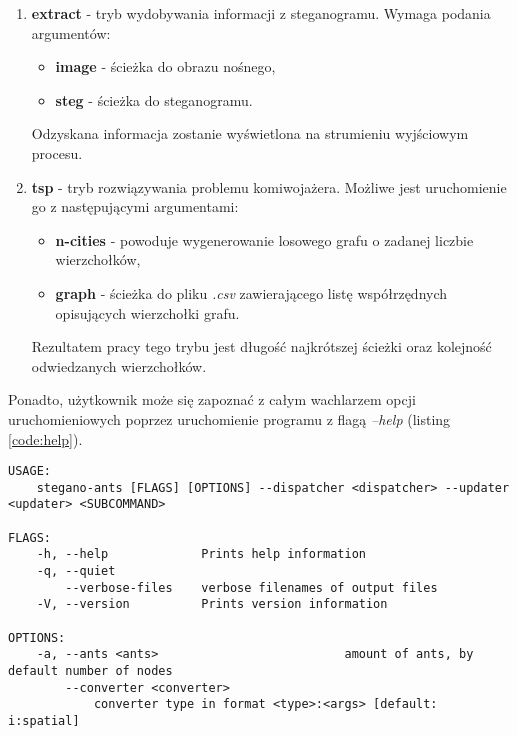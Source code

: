{{{\begin{enumerate}
                \item \textbf{extract} - tryb wydobywania informacji z steganogramu. Wymaga podania argumentów:
                    \begin{itemize}
                        \item \textbf{image} - ścieżka do obrazu nośnego,
                        \item \textbf{steg} - ścieżka do steganogramu.
                    \end{itemize}

                    Odzyskana informacja zostanie wyświetlona na strumieniu wyjściowym procesu.

                \item \textbf{tsp} - tryb rozwiązywania problemu komiwojażera. Możliwe jest uruchomienie go z
                następującymi argumentami:
                    \begin{itemize}
                        \item \textbf{n-cities} - powoduje wygenerowanie losowego grafu o zadanej liczbie wierzchołków,
                        \item \textbf{graph} - ścieżka do pliku \textit{.csv} zawierającego listę współrzędnych
                        opisujących wierzchołki grafu.
                    \end{itemize}

                    Rezultatem pracy tego trybu jest długość najkrótszej ścieżki oraz kolejność odwiedzanych wierzchołków.
            \end{enumerate}


            Ponadto, użytkownik może się zapoznać z całym wachlarzem opcji uruchomieniowych poprzez uruchomienie
            programu z flagą \textit{--help} (listing \ref{code:help}).

            \begin{lstlisting}[basicstyle=\tiny, caption=Pomoc programu, label=code:help]
USAGE:
    stegano-ants [FLAGS] [OPTIONS] --dispatcher <dispatcher> --updater <updater> <SUBCOMMAND>

FLAGS:
    -h, --help             Prints help information
    -q, --quiet
        --verbose-files    verbose filenames of output files
    -V, --version          Prints version information

OPTIONS:
    -a, --ants <ants>                          amount of ants, by default number of nodes
        --converter <converter>
            converter type in format <type>:<args> [default: i:spatial]


\end{lstlisting}}}}
